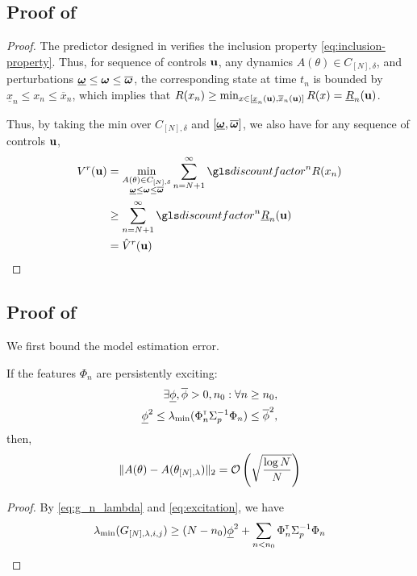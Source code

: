 \begin{subappendices}
	
	\subsection{Proof of }
	
	\begin{proof}
		The predictor designed in  verifies the inclusion property \eqref{eq:inclusion-property}. Thus, for sequence of controls $\mathbf{u}$, any dynamics $A(\theta)\in C_{[N],\delta}$, and perturbations $\underline{\bm{\omega}} \leq \bm{\omega} \leq \overline{\bm{\omega}}$, the corresponding state at time $t_n$ is bounded by $\underline{x}_n \leq x_n \leq \overline{x}_n$, which implies that $R(x_n) \geq \min_{x\in[\underline{x}_n(\mathbf{u}), \overline{x}_n(\mathbf{u})]}  R(x) = \underline{R}_n(\mathbf{u})$.
		
		Thus, by taking the min over $C_{[N],\delta}$ and $[\underline{\bm{\omega}}, \overline{\bm{\omega}}]$, we also have for any sequence of controls $\mathbf{u}$,
		\begin{align*}
		V^r(\bu) &= \min_{\substack{A(\theta)\in C_{[N],\delta}\\ \underline{\bom} \leq \bom \leq \overline{\bom}}} \sum_{n=N+1}^\infty \discount^n R(x_n)\\
		&\geq \sum_{n=N+1}^\infty \discount^n \underline{R}_n(\bu)\\
		&= \hat{V}^r(\bu)
		\end{align*}
	\end{proof}
	
	\subsection{Proof of }
	
	We first bound the model estimation error.
	\begin{lemma}
		\begin{leftbar}[lemmabar]
		If the features $\Phi_n$ are persistently exciting:
		\begin{align}
		\label{eq:excitation}
		\exists \underline{\phi},\overline{\phi}>0, n_0: \forall n\geq n_0,\nonumber\\ \underline{\phi}^2 \leq \lambda_{\min}(\Phi_{n}^{\mathsf{\scriptscriptstyle T}}\Sigma_{p}^{-1}\Phi_{n}) \leq \overline{\phi}^2,
		\end{align}
		then,
		\[\|A(\theta) - A(\theta_{[N],\lambda})\|_2 = \mathcal{O}\left( \sqrt{\frac{\log N}{N}} \right) \]
	\end{leftbar}
	\end{lemma}
	\begin{proof}
		By \eqref{eq:g_n_lambda} and \eqref{eq:excitation}, we have $$\lambda_{\min}(G_{[N],\lambda,i,j}) \geq (N-n_0)\underline{\phi}^2 + \sum_{n<n_0}\Phi_{n}^{\mathsf{\scriptscriptstyle T}}\Sigma_{p}^{-1}\Phi_{n}$$
		

\end{proof}
\end{subappendices}
